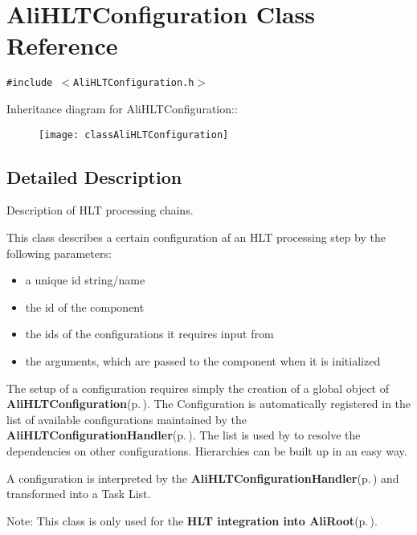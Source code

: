 \section{Ali\-HLTConfiguration Class Reference}
\label{classAliHLTConfiguration}
{\tt \#include $<$Ali\-HLTConfiguration.h$>$}

Inheritance diagram for Ali\-HLTConfiguration::\begin{figure}[H]
\begin{center}
\leavevmode
\texttt{[image: classAliHLTConfiguration]}
\end{center}
\end{figure}


\subsection{Detailed Description}
Description of HLT processing chains. 

This class describes a certain configuration af an HLT processing step by the following parameters:\begin{itemize}
\item a unique id string/name\item the id of the component\item the ids of the configurations it requires input from\item the arguments, which are passed to the component when it is initialized\end{itemize}


The setup of a configuration requires simply the creation of a global object of {\bf Ali\-HLTConfiguration}{\rm (p.\,\pageref{classAliHLTConfiguration})}. The Configuration is automatically registered in the list of available configurations maintained by the {\bf Ali\-HLTConfiguration\-Handler}{\rm (p.\,\pageref{classAliHLTConfigurationHandler})}. The list is used by to resolve the dependencies on other configurations. Hierarchies can be built up in an easy way.

A configuration is interpreted by the {\bf Ali\-HLTConfiguration\-Handler}{\rm (p.\,\pageref{classAliHLTConfigurationHandler})} and transformed into a Task List.

\begin{Desc}
\item[Note:]This class is only used for the {\bf HLT integration into Ali\-Root}{\rm (p.\,\pageref{group__alihlt__system})}. \end{Desc}




